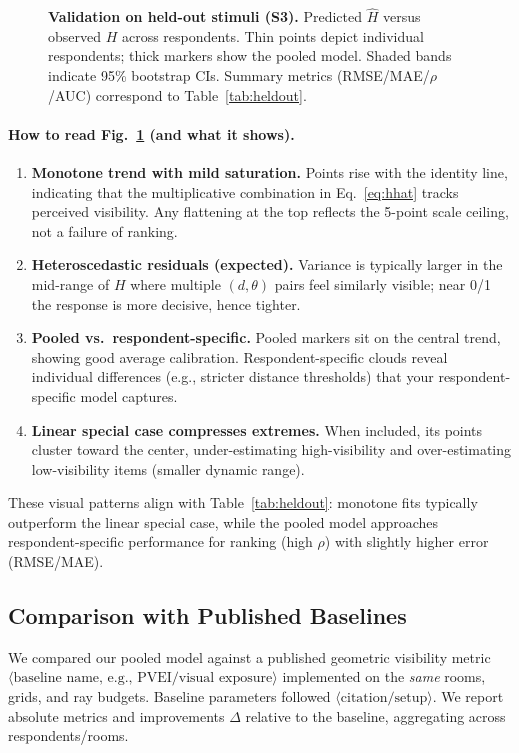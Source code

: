 \documentclass[final,3p,times,review]{elsarticle}
\begin{document}
\begin{figure}[t]
  \centering
  \caption{\textbf{Validation on held-out stimuli (S3).} Predicted $\widehat{H}$ versus observed $H$ across respondents. Thin points depict individual respondents; thick markers show the pooled model. Shaded bands indicate 95\% bootstrap CIs. Summary metrics (RMSE/MAE/$\rho$/AUC) correspond to Table~\ref{tab:heldout}.}
  \label{fig:validation}
\end{figure}

\paragraph{How to read Fig.~\ref{fig:validation} (and what it shows).}
\begin{enumerate}
  \item \textbf{Monotone trend with mild saturation.} Points rise with the identity line, indicating that the multiplicative combination in Eq.~\eqref{eq:hhat} tracks perceived visibility. Any flattening at the top reflects the 5-point scale ceiling, not a failure of ranking.
  \item \textbf{Heteroscedastic residuals (expected).} Variance is typically larger in the mid-range of $H$ where multiple $(d,\theta)$ pairs feel similarly visible; near 0/1 the response is more decisive, hence tighter.
  \item \textbf{Pooled vs.\ respondent-specific.} Pooled markers sit on the central trend, showing good average calibration. Respondent-specific clouds reveal individual differences (e.g., stricter distance thresholds) that your respondent-specific model captures.
  \item \textbf{Linear special case compresses extremes.} When included, its points cluster toward the center, under-estimating high-visibility and over-estimating low-visibility items (smaller dynamic range).
\end{enumerate}
These visual patterns align with Table~\ref{tab:heldout}: monotone fits typically outperform the linear special case, while the pooled model approaches respondent-specific performance for ranking (high $\rho$) with slightly higher error (RMSE/MAE).

\subsection{Comparison with Published Baselines}
We compared our pooled model against a published geometric visibility metric $\langle \text{baseline name, e.g., PVEI/visual exposure} \rangle$ implemented on the \emph{same} rooms, grids, and ray budgets. Baseline parameters followed $\langle \text{citation/setup} \rangle$. We report absolute metrics and improvements $\Delta$ relative to the baseline, aggregating across respondents/rooms.
\end{document}
